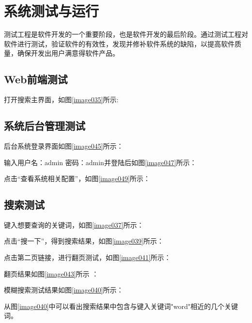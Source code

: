 
\chapter{系统测试与运行}
测试工程是软件开发的一个重要阶段，也是软件开发的最后阶段。通过测试工程对软件进行测试，验证软件的有效性，发现并修补软件系统的缺陷，以提高软件质量，确保开发出用户满意得软件产品。
\section{Web前端测试}
打开搜索主界面，如图\ref{image035}所示:


\section{系统后台管理测试}
后台系统登录界面如图\ref{image045}所示：
\newpage
{}

输入用户名：admin 密码：admin并登陆后如图\ref{image047}所示：

\newpage
点击“查看系统相关配置”，如图\ref{image049}所示：


\section{搜索测试}
键入想要查询的关键词，如图\ref{image037}所示：

\newpage
点击“搜一下”，得到搜索结果，如图\ref{image039}所示：


点击第二页链接，进行翻页测试，如图\ref{image041}所示：


翻页结果如图\ref{image043}所示 ：


模糊搜索测试结果如图\ref{image040}所示：


从图\ref{image040}中可以看出搜索结果中包含与键入关键词"word"相近的几个关键词。





